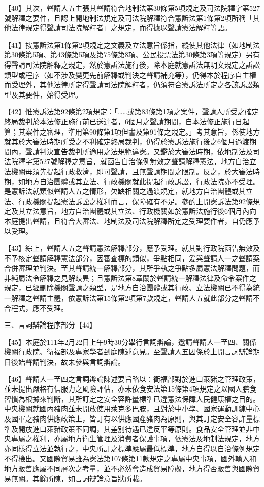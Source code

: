 \documentclass{ctexart} %
\begin{document}
{【40】其次，聲請人五主張其聲請符合地制法第30條第5項規定及司法院釋字第527號解釋之要件，且認上開地制法規定及司法院解釋符合憲訴法第1條第2項所稱「其他法律規定得聲請司法院解釋者」之規定，而得據以聲請憲法解釋等語。

【41】按憲訴法第1條第2項規定之文義及立法意旨係指，縱使其他法律（如地制法第30條第5項、第43條第5項及第75條第8項、公民投票法第30條第3項等規定）另有得聲請司法院解釋之規定，然於憲訴法施行後，除本庭就憲訴法無明文規定之訴訟類型或程序（如不涉及變更先前解釋或判決之聲請補充等），仍得本於程序自主權而受理外，其他法律所定得聲請司法院解釋者，仍須符合憲訴法所定之各該訴訟類型及其要件，始得受理。

【42】惟憲訴法第92條第2項規定：「……或第83條第1項之案件，聲請人所受之確定終局裁判於本法修正施行前已送達者，6個月之聲請期間，自本法修正施行日起算；其案件之審理，準用第90條第1項但書及第91條之規定。」考其意旨，係使地方就其於大審法時期所受之不利確定終局裁判，仍得於憲訴法施行後之6個月過渡期間內，聲請判決宣告裁判所適用之法規範違憲。又鑑於大審法時期，依地制法及司法院釋字第527號解釋之意旨，就函告自治條例無效之聲請解釋憲法，地方自治立法機關毋須先提起行政救濟，即可聲請，且無聲請期間之限制。反之，於大審法時期，如地方自治團體或其立法、行政機關就此提起行政訴訟，行政法院亦不受理。是憲訴法就類似聲請人五之情形，欠缺相關之過渡規定，就地方自治團體或其立法、行政機關提起憲法訴訟之權利而言，保障確有不足。參酌上開憲訴法第92條規定及其立法意旨，地方自治團體或其立法、行政機關如於憲訴法施行後6個月內向本庭提出聲請，且符合大審法、地制法及司法院解釋所定之受理要件者，自仍應予以受理。

【43】綜上，聲請人五之聲請憲法解釋部分，應予受理。就其對行政院函告無效及不予核定聲請解釋憲法部分，因審查標的類似，爭點相同，爰與聲請人一之聲請案合併審理並判決。至其聲請統一解釋部分，其所爭執之爭點多屬憲法解釋問題，而非純屬法令解釋之見解歧異；且憲訴法第8章關於聲請統一解釋法律及命令案件之規定，已經刪除機關聲請之類型，是地方自治團體或其行政、立法機關已不得為統一解釋之聲請主體，依憲訴法第15條第2項第7款規定，聲請人五就此部分之聲請不合程式，應不受理。

三、言詞辯論程序部分【44】

【45】本庭於111年2月22日上午9時30分舉行言詞辯論，邀請聲請人一至四、關係機關行政院、衛福部及專家學者到庭陳述意見。至聲請人五因係於上開言詞辯論期日後始聲請判決，故未參與言詞辯論。

【46】聲請人一至四之言詞辯論陳述要旨略以：衛福部對於進口萊豬之管理政策，並未提出嚴格有信服力之風險評估，亦未依食安法第15條第4項規定之以國人膳食習慣為根據來判斷，其所訂定之安全容許量標準已違憲法保障人民健康權之目的。中央機關就國內豬肉並未開放使用萊克多巴胺，且對於中小學、國家運動訓練中心及國軍之豬肉供應政策上，皆訂有以供應國產豬肉為原則，與其訂定安全容許量標準及開放進口萊豬政策不同調，其差別待遇已違反平等原則。食品安全管理並非中央專屬之權利，亦屬地方衛生管理及消費者保護事項，依憲法及地制法規定，地方亦同樣得立法並執行之，中央所訂之標準應屬最低標準，地方自得以自治條例規定不得檢出。又國際貿易雖為憲法第107條第11款規定之專屬中央事項，國外輸入和地方販售應屬不同層次之考量，並不必然會造成貿易障礙，地方得否販售與國際貿易無關。其餘所陳，如言詞辯論意旨狀所載。

}
\end{document}
